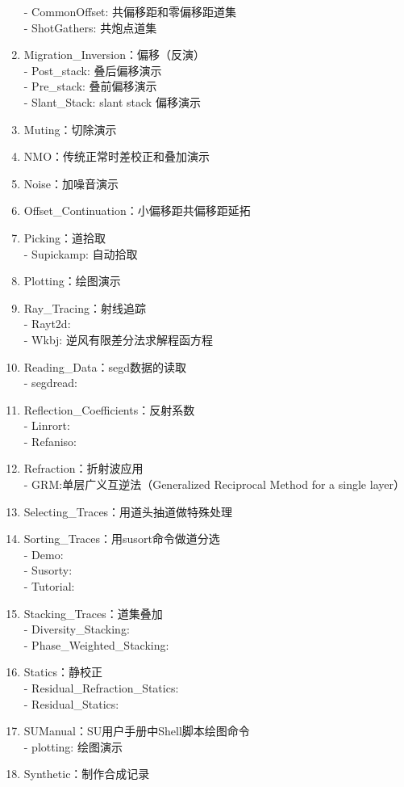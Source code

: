 \begin{enumerate}
	- CommonOffset: 共偏移距和零偏移距道集\\
	- ShotGathers: 共炮点道集
	\item Migration\_Inversion：偏移（反演）\\
	- Post\_stack: 叠后偏移演示\\
	- Pre\_stack: 叠前偏移演示\\
	- Slant\_Stack: slant stack 偏移演示
	\item Muting：切除演示
	\item NMO：传统正常时差校正和叠加演示
	\item Noise：加噪音演示
	\item Offset\_Continuation：小偏移距共偏移距延拓
	\item Picking：道拾取\\
	- Supickamp: 自动拾取
	\item Plotting：绘图演示
	\item Ray\_Tracing：射线追踪\\
	- Rayt2d: \\
	- Wkbj: 逆风有限差分法求解程函方程
	\item Reading\_Data：segd数据的读取\\
	- segdread: 
	\item Reflection\_Coefficients：反射系数\\
	- Linrort: \\
	- Refaniso: 
	\item Refraction：折射波应用\\
	- GRM:单层广义互逆法（Generalized Reciprocal Method for a single layer）
	\item Selecting\_Traces：用道头抽道做特殊处理
	\item Sorting\_Traces：用susort命令做道分选\\
	- Demo: \\
	- Susorty: \\
	- Tutorial: 
	\item Stacking\_Traces：道集叠加\\
	- Diversity\_Stacking: \\
	- Phase\_Weighted\_Stacking: 
	\item Statics：静校正\\
	- Residual\_Refraction\_Statics:\\ 
	- Residual\_Statics: 
	\item SUManual：SU用户手册中Shell脚本绘图命令\\
	- plotting: 绘图演示
	\item Synthetic：制作合成记录\\

\end{enumerate}
